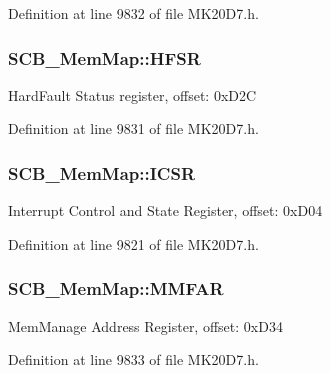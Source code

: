 Definition at line 9832 of file M\+K20\+D7.\+h.

\subsubsection[{\texorpdfstring{H\+F\+SR}{HFSR}}]{ S\+C\+B\+\_\+\+Mem\+Map\+::\+H\+F\+SR}\hypertarget{struct_s_c_b___mem_map_a7f0b5d6f24446f1f603a6d9ef6259de2}{}\label{struct_s_c_b___mem_map_a7f0b5d6f24446f1f603a6d9ef6259de2}
Hard\+Fault Status register, offset\+: 0x\+D2C 

Definition at line 9831 of file M\+K20\+D7.\+h.

\subsubsection[{\texorpdfstring{I\+C\+SR}{ICSR}}]{ S\+C\+B\+\_\+\+Mem\+Map\+::\+I\+C\+SR}\hypertarget{struct_s_c_b___mem_map_aafbaa0d0a4b79969877c9b84be8aaf7a}{}\label{struct_s_c_b___mem_map_aafbaa0d0a4b79969877c9b84be8aaf7a}
Interrupt Control and State Register, offset\+: 0x\+D04 

Definition at line 9821 of file M\+K20\+D7.\+h.

\subsubsection[{\texorpdfstring{M\+M\+F\+AR}{MMFAR}}]{ S\+C\+B\+\_\+\+Mem\+Map\+::\+M\+M\+F\+AR}\hypertarget{struct_s_c_b___mem_map_af81b60a951ac45ddc8376500ed1580ef}{}\label{struct_s_c_b___mem_map_af81b60a951ac45ddc8376500ed1580ef}
Mem\+Manage Address Register, offset\+: 0x\+D34 

Definition at line 9833 of file M\+K20\+D7.\+h.

